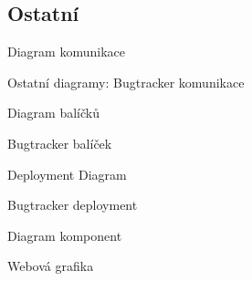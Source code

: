 \subsection{Ostatní}




\begin{frame}{Diagram komunikace}

Ostatní diagramy:
\newline Bugtracker komunikace

\begin{figure}
\end{figure}

\end{frame}



\begin{frame}{Diagram balíčků}

Bugtracker balíček

\begin{figure}
\end{figure}

\end{frame}



\begin{frame}{Deployment Diagram}

Bugtracker deployment

\begin{figure}
\end{figure}

\end{frame}



\begin{frame}{Diagram komponent}

Webová grafika

\begin{figure}
\end{figure}

\end{frame}